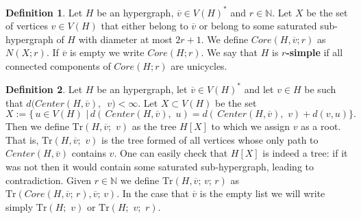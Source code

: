 \documentclass[12pt,notitlepage,a4paper]{article}
\theoremstyle{definition}
\newtheorem{definition}{Definition}[section]
\newcommand{\N}{\mathbb{N}}
\newcommand{\Tr}{\mathrm{Tr}}
\begin{document}
\begin{definition}
Let $H$ be an hypergraph, $\overline{v}\in V(H)^*$
and $r\in \N$. Let $X$ be the set of vertices $v\in V(H)$
that either belong to $\overline{v}$ or belong 
to some saturated sub-hypergraph of $H$ with
diameter at most $2r+1$. 
We define $Core(H, \overline{v};r)$ as $N(X;r)$. If
$\overline{v}$ is empty we write $Core(H;r)$.
We say that $H$ is \textbf{$r$-simple} if all connected components of 
$Core(H;r)$ are unicycles. 	
\end{definition}



\begin{definition}\label{def:TrOperator}
	Let $H$ be an hypergraph, let $\overline{v}\in V(H)^*$ and 
	let $v\in H$ be such that $d(Center(H,\overline{v}),$ $ \, v)<\infty$. 
	Let $X\subset V(H)$ be the set
	\[
	X:=\big\{\, u\in V(H) \,\, \big| \, 
	d\left(\, Center(H, \overline{v})
	, \, \, u \right)= d\left(\, Center(H, \overline{v})
	, \, \, v \right) + d(v,u)
	\big\}.
	\]
	Then we define $\mathrm{Tr}\left(
	H,\overline{v};\,\, v\right)$ as the tree $H[X]$ 		
	to which we assign $v$ as a root. That is,
	$\mathrm{Tr}\left(
	H,\overline{v};\,\, v\right)$ is the tree formed of all 
	vertices whose only path to $Center(H,\overline{v})$ 
	contains $v$. One can easily check that $H[X]$ is indeed a tree:
	if it was not then it would contain some saturated sub-hypergraph, leading
	to contradiction. 
	Given $r\in \N$ we define $\mathrm{Tr}(H,\overline{v};\, v;\, r)$ as
	$\mathrm{Tr}( Core(H,\overline{v};\,r),\overline{v}; \, v)$.
	In the case that $\overline{v}$ is the empty list we will write
	simply $\mathrm{Tr}(H;\,\, v)$ or $\Tr(H;\,\,v;\,\,r)$.
\end{definition}


 
\end{document}
